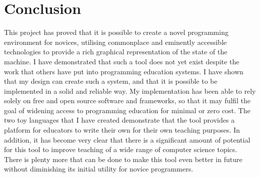 \chapter{Conclusion}

This project has proved that it is possible to create a novel programming environment for novices, utilising commonplace and eminently accessible technologies to provide a rich graphical representation of the state of the machine. I have demonstrated that such a tool does not yet exist despite the work that others have put into programming education systems. I have shown that my design can create such a system, and that it is possible to be implemented in a solid and reliable way. My implementation has been able to rely solely on free and open source software and frameworks, so that it may fulfil the goal of widening access to programming education for minimal or zero cost. The two toy languages that I have created demonstrate that the tool provides a platform for educators to write their own for their own teaching purposes. In addition, it has become very clear that there is a significant amount of potential for this tool to improve teaching of a wide range of computer science topics. There is plenty more that can be done to make this tool even better in future without diminishing its initial utility for novice programmers.